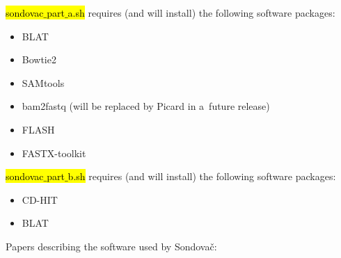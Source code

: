 \documentclass[a4paper, 11pt, twoside]{article}
\renewcommand{\texttt}[1]{\hl{\ttfamily #1}}
\begin{document}
\texttt{sondovac$\_$part$\_$a.sh} requires (and will install) the following software packages:

\begin{itemize}
  \item BLAT
  \item Bowtie2
  \item SAMtools
  \item bam2fastq (will be replaced by Picard in a~future release)
  \item FLASH
  \item FASTX-toolkit
\end{itemize}

\texttt{sondovac$\_$part$\_$b.sh} requires (and will install) the following software packages:

\begin{itemize}
  \item CD-HIT
  \item BLAT
\end{itemize}

Papers describing the software used by Sondovač:
\end{document}
